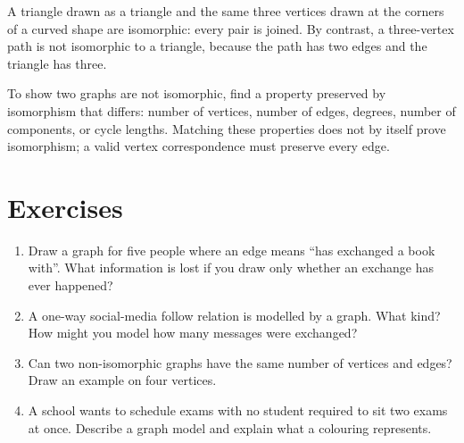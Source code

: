 \begin{example}
A triangle drawn as a triangle and the same three vertices drawn at the corners of a curved shape are isomorphic: every pair is joined. By contrast, a three-vertex path is not isomorphic to a triangle, because the path has two edges and the triangle has three.
\end{example}

To show two graphs are not isomorphic, find a property preserved by isomorphism that differs: number of vertices, number of edges, degrees, number of components, or cycle lengths. Matching these properties does not by itself prove isomorphism; a valid vertex correspondence must preserve every edge.

\section*{Exercises}
\begin{enumerate}
\item Draw a graph for five people where an edge means ``has exchanged a book with''. What information is lost if you draw only whether an exchange has ever happened?
\item A one-way social-media follow relation is modelled by a graph. What kind? How might you model how many messages were exchanged?
\item Can two non-isomorphic graphs have the same number of vertices and edges? Draw an example on four vertices.
\item A school wants to schedule exams with no student required to sit two exams at once. Describe a graph model and explain what a colouring represents.
\end{enumerate}
